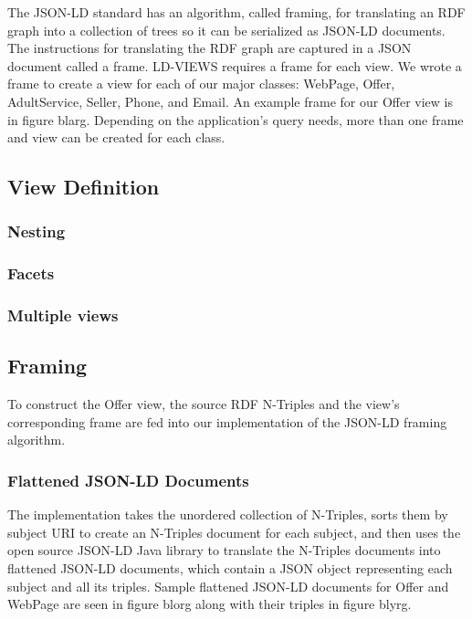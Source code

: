 The JSON-LD standard has an algorithm, called framing, for translating an RDF graph into a collection of trees so it can be serialized as JSON-LD documents. %
The instructions for translating the RDF graph are captured in a JSON document called a frame.  
LD-VIEWS requires a frame for each view.  
We wrote a frame to create a view for each of our major classes: WebPage, Offer, AdultService, Seller, Phone, and Email.  
An example frame for our Offer view is in figure blarg.  
Depending on the application's query needs, more than one frame and view can be created for each class.  

\subsection{View Definition}
\subsubsection{Nesting}
\subsubsection{Facets}
\subsubsection{Multiple views}

\subsection{Framing}
To construct the Offer view, the source RDF N-Triples and the view's corresponding frame are fed into our implementation of the JSON-LD framing algorithm.  

\subsubsection{Flattened JSON-LD Documents}
The implementation takes the unordered collection of N-Triples, sorts them by subject URI to create an N-Triples document for each subject, and then uses the open source JSON-LD Java library to translate the N-Triples documents into flattened JSON-LD documents, which contain a JSON object representing each subject and all its triples.
Sample flattened JSON-LD documents for Offer and WebPage are seen in figure blorg along with their triples in figure blyrg.

